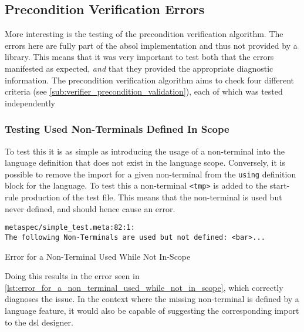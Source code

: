 
\subsection{Precondition Verification Errors} %
\label{sub:precondition_verification_errors}
More interesting is the testing of the precondition verification algorithm.
The errors here are fully part of the \gls{absol} implementation and thus not provided by a library. 
This means that it was very important to test both that the errors manifested as expected, \textit{and} that they provided the appropriate diagnostic information.
The precondition verification algorithm aims to check four different criteria (see \autoref{sub:verifier_precondition_validation}), each of which was tested independently

\subsubsection{Testing Used Non-Terminals Defined In Scope} %
\label{ssub:testing_used_non_terminals_defined_in_scope}
To test this it is as simple as introducing the usage of a non-terminal into the language definition that does not exist in the language scope. 
Conversely, it is possible to remove the import for a given non-terminal from the \texttt{using} definition block for the language.
To test this a non-terminal \texttt{<tmp>} is added to the start-rule production of the test file. 
This means that the non-terminal is used but never defined, and should hence cause an error.

\begin{listing}[!htb]
\begin{verbatim}
metaspec/simple_test.meta:82:1:
The following Non-Terminals are used but not defined: <bar>... 
\end{verbatim}
\caption{Error for a Non-Terminal Used While Not In-Scope}
\label{lst:error_for_a_non_terminal_used_while_not_in_scope}
\end{listing}

Doing this results in the error seen in \autoref{lst:error_for_a_non_terminal_used_while_not_in_scope}, which correctly diagnoses the issue.
In the context where the missing non-terminal is defined by a language feature, it would also be capable of suggesting the corresponding import to the \gls{dsl} designer.


